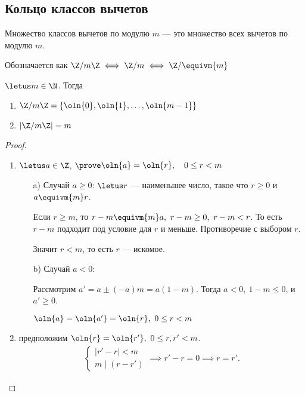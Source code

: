 \subsection{Кольцо классов вычетов}

\begin{defn}
    Множество классов вычетов по модулю $m$ --- это множество всех вычетов по модулю $m$.

    Обозначается как $\Z/m\Z \iff \Z/m \iff \Z/\equivm{m}$
\end{defn}

\begin{theorem}

    $\letus m \in \N$. Тогда 
    
    \begin{enumerate}
        \item $\Z/m\Z = \{\oln{0}, \oln{1}, \ldots, \oln{m-1}\}$
        \item $|\Z/m\Z| = m$ 
    \end{enumerate}
\end{theorem}

\begin{proof}

    \begin{enumerate}
        \item $\letus a \in \Z$, $\prove \oln{a} = \oln{r}, \quad 0 \leq r < m$
        \begin{enumerate}
            \item[a)] Случай $a \geq 0$: $\letus r$ --- наименьшее число, такое что $r \geq 0$ и $a \equivm{m} r$.
            
            Если $r \geq m$, то $r - m \equivm{m} a,~ r - m \geq 0,~ r - m < r$. 
            То есть $r - m$ подходит под условие для $r$ и меньше. 
            Противоречие с выбором $r$.
            
            Значит $r < m$, то есть $r$ --- искомое.
            
            \item[b)] Случай $a < 0$: 
            
            Рассмотрим $a' = a \pm (-a)m = a(1-m)$. Тогда $a < 0,~1 - m \le 0$, и $a' \ge 0$.
            
            $\oln{a} = \oln{a'} = \oln{r},~ 0 \leq r < m$
        \end{enumerate}
        
        \item предположим $\oln{r} = \oln{r'},~ 0 \leq r, r' < m$.
        \begin{gather*}
            \begin{cases}|r' - r| < m \\ m \mid (r - r')\end{cases} \implies r' - r = 0 \implies r = r'.
        \end{gather*}
    \end{enumerate}
\end{proof}

